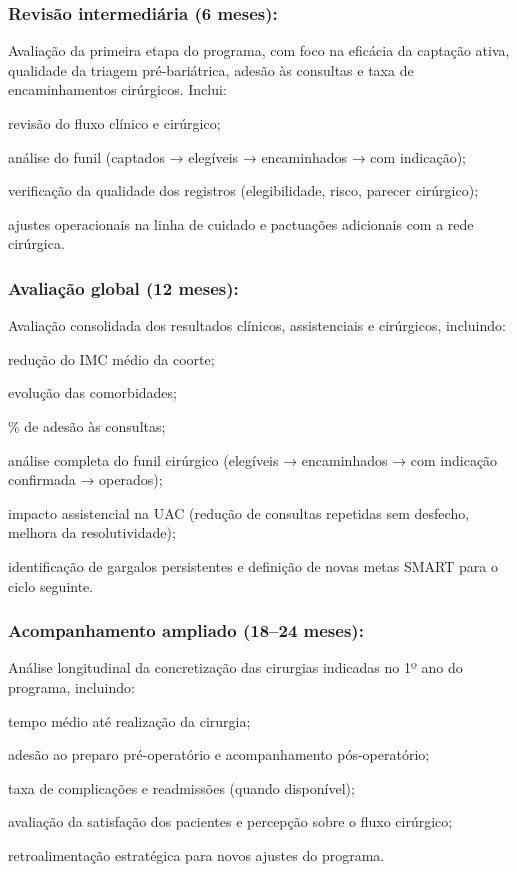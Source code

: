 \documentclass[12pt]{article}
\begin{document}
\subsubsection{\textbf{Revisão intermediária (6 meses):}}
\label{sec:orgfe93c22}
Avaliação da primeira etapa do programa, com foco na eficácia da captação ativa, qualidade da triagem pré-bariátrica, adesão às consultas e taxa de encaminhamentos cirúrgicos. Inclui:
\begin{hlevelthree}
\item revisão do fluxo clínico e cirúrgico;
\item análise do funil (captados → elegíveis → encaminhados → com indicação);
\item verificação da qualidade dos registros (elegibilidade, risco, parecer cirúrgico);
\item ajustes operacionais na linha de cuidado e pactuações adicionais com a rede cirúrgica.
\end{hlevelthree}

\subsubsection{\textbf{Avaliação global (12 meses):}}
\label{sec:org11caf55}
Avaliação consolidada dos resultados clínicos, assistenciais e cirúrgicos, incluindo:
\begin{hlevelthree}
\item redução do IMC médio da coorte;
\item evolução das comorbidades;
\item \% de adesão às consultas;
\item análise completa do funil cirúrgico (elegíveis → encaminhados → com indicação confirmada → operados);
\item impacto assistencial na UAC (redução de consultas repetidas sem desfecho, melhora da resolutividade);
\item identificação de gargalos persistentes e definição de novas metas SMART para o ciclo seguinte.
\end{hlevelthree}

\subsubsection{\textbf{Acompanhamento ampliado (18–24 meses):}}
\label{sec:org2b79f34}
Análise longitudinal da concretização das cirurgias indicadas no 1º ano do programa, incluindo:
\begin{hlevelthree}
\item tempo médio até realização da cirurgia;
\item adesão ao preparo pré-operatório e acompanhamento pós-operatório;
\item taxa de complicações e readmissões (quando disponível);
\item avaliação da satisfação dos pacientes e percepção sobre o fluxo cirúrgico;
\item retroalimentação estratégica para novos ajustes do programa.
\end{hlevelthree}
\end{document}
